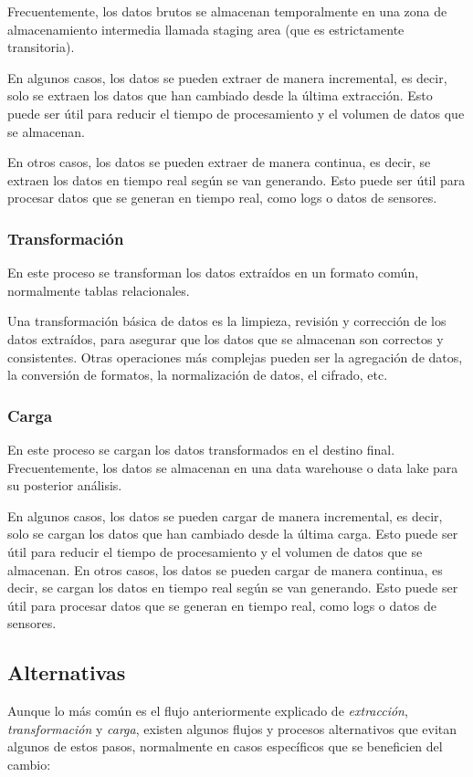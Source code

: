 Frecuentemente, los datos brutos se almacenan temporalmente en una zona de almacenamiento intermedia
llamada staging area (que es estrictamente transitoria).

En algunos casos, los datos se pueden extraer de manera incremental, es decir, solo se extraen los
datos que han cambiado desde la última extracción. Esto puede ser útil para reducir el tiempo de
procesamiento y el volumen de datos que se almacenan.

En otros casos, los datos se pueden extraer de manera continua, es decir, se extraen los datos en
tiempo real según se van generando. Esto puede ser útil para procesar datos que se generan en tiempo
real, como logs o datos de sensores.

\subsubsection{Transformación}
En este proceso se transforman los datos extraídos en un formato común, normalmente tablas relacionales.

Una transformación básica de datos es la limpieza, revisión y corrección de los datos extraídos,
para asegurar que los datos que se almacenan son correctos y consistentes. Otras operaciones más
complejas pueden ser la agregación de datos, la conversión de formatos, la normalización de datos,
el cifrado, etc.

\subsubsection{Carga}
En este proceso se cargan los datos transformados en el destino final. Frecuentemente, los datos se
almacenan en una data warehouse o data lake para su posterior análisis.

En algunos casos, los datos se pueden cargar de manera incremental, es decir, solo se cargan los datos
que han cambiado desde la última carga. Esto puede ser útil para reducir el tiempo de procesamiento y
el volumen de datos que se almacenan. En otros casos, los datos se pueden cargar de manera continua,
es decir, se cargan los datos en tiempo real según se van generando. Esto puede ser útil para procesar
datos que se generan en tiempo real, como logs o datos de sensores.

\subsection{Alternativas}
Aunque lo más común es el flujo anteriormente explicado de \textit{extracción}, \textit{transformación} y
\textit{carga}, existen algunos flujos y procesos alternativos que evitan algunos de estos pasos, normalmente
en casos específicos que se beneficien del cambio:

